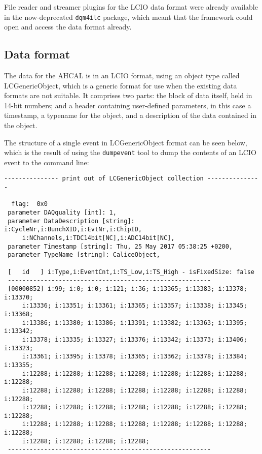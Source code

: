 File reader and streamer plugins for the LCIO data format were already available in the now-deprecated \texttt{dqm4ilc} package, which meant that the framework could open and access the data format already.

\subsection{Data format}
The data for the AHCAL is in an LCIO format, using an object type called LCGenericObject, which is a generic format for use when the existing data formats are not suitable. It comprises two parts: the block of data itself, held in 14-bit numbers; and a header containing user-defined parameters, in this case a timestamp, a typename for the object, and a description of the data contained in the object.

The structure of a single event in LCGenericObject format can be seen below, which is the result of using the \texttt{dumpevent} tool to dump the contents of an LCIO event to the command line:

\begin{verbatim}
--------------- print out of LCGenericObject collection --------------- 

  flag:  0x0
 parameter DAQquality [int]: 1, 
 parameter DataDescription [string]: i:CycleNr,i:BunchXID,i:EvtNr,i:ChipID,
     i:NChannels,i:TDC14bit[NC],i:ADC14bit[NC], 
 parameter Timestamp [string]: Thu, 25 May 2017 05:38:25 +0200, 
 parameter TypeName [string]: CaliceObject, 

 [   id   ] i:Type,i:EventCnt,i:TS_Low,i:TS_High - isFixedSize: false
 --------------------------------------------------------
 [00000852] i:99; i:0; i:0; i:121; i:36; i:13365; i:13383; i:13378; i:13370;
     i:13336; i:13351; i:13361; i:13365; i:13357; i:13338; i:13345; i:13368;
     i:13386; i:13380; i:13386; i:13391; i:13382; i:13363; i:13395; i:13342;
     i:13378; i:13335; i:13327; i:13376; i:13342; i:13373; i:13406; i:13323;
     i:13361; i:13395; i:13378; i:13365; i:13362; i:13378; i:13384; i:13355;
     i:12288; i:12288; i:12288; i:12288; i:12288; i:12288; i:12288; i:12288;
     i:12288; i:12288; i:12288; i:12288; i:12288; i:12288; i:12288; i:12288;
     i:12288; i:12288; i:12288; i:12288; i:12288; i:12288; i:12288; i:12288;
     i:12288; i:12288; i:12288; i:12288; i:12288; i:12288; i:12288; i:12288;
     i:12288; i:12288; i:12288; i:12288;
 --------------------------------------------------------
\end{verbatim}

